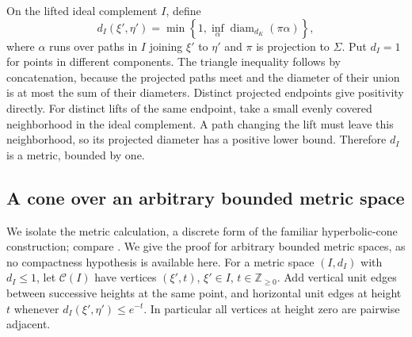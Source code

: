 \documentclass[11pt,reqno]{amsart}
\numberwithin{equation}{section}
\theoremstyle{definition}
\theoremstyle{remark}
\begin{document}
On the lifted ideal complement $I$, define
\begin{equation}\label{mod:ideal-metric}
 d_I(\xi',\eta')=
 \min\left\{1,\inf_\alpha\operatorname{diam}_{d_K}(\pi\alpha)\right\},
\end{equation}
where $\alpha$ runs over paths in $I$ joining $\xi'$ to $\eta'$
and $\pi$ is projection to $\Sigma$.  Put $d_I=1$ for points in
different components.  The triangle inequality follows by
concatenation, because the projected paths meet and the diameter
of their union is at most the sum of their diameters.  Distinct
projected endpoints give positivity directly.  For distinct lifts
of the same endpoint, take a small evenly covered neighborhood
in the ideal complement.  A path changing the lift must leave
this neighborhood, so its projected diameter has a positive
lower bound.  Therefore $d_I$ is a metric, bounded by one.

\subsection{A cone over an arbitrary bounded metric space}

We isolate the metric calculation, a discrete form of the familiar
hyperbolic-cone construction; compare \cite[Section~7]{BonkSchramm2000}.
We give the proof for arbitrary bounded metric spaces, as no
compactness hypothesis is available here.  For a metric space $(I,d_I)$
with $d_I\le1$, let $\mathcal C(I)$ have vertices $(\xi',t)$,
$\xi'\in I$, $t\in\mathbb Z_{\ge0}$.  Add vertical unit edges between
successive heights at the same point, and horizontal unit edges
at height $t$ whenever $d_I(\xi',\eta')\le e^{-t}$.
In particular all vertices at height zero are pairwise adjacent.
\end{document}
